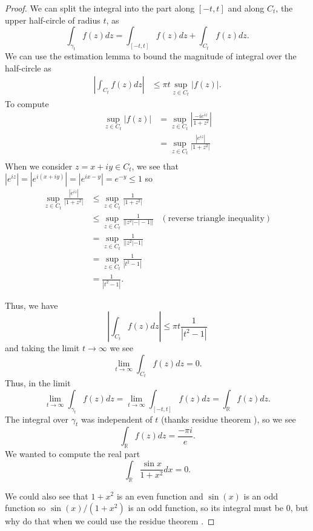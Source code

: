 \documentclass{article}
\begin{document}
\begin{enumerate}
\begin{proof}
		We can split the integral into the part along $[-t,t]$ and along $C_t$, the upper half-circle of radius $t$, as
		\[ \int_{\gamma_t} f(z) dz = \int_{[-t,t]} f(z) dz + \int_{C_t} f(z) dz.\]
		We can use the estimation lemma to bound the magnitude of integral over the half-circle as 
		\begin{align*}
			|\int_{C_t} f(z) dz |&\leq \pi t \sup_{z \in C_t} |f(z)|.
		\end{align*}
		To compute 
		\begin{align*}
			\sup_{z \in C_t} |f(z)| &= \sup_{z \in C_t} \left | \frac{-ie^{iz} }{1+z^2} \right |\\
			&= \sup_{z \in C_t} \frac{|e^{iz} |}{|1+z^2|} \\
		\end{align*}
		When we consider $z = x+iy \in C_t$, we see that $|e^{iz}| = |e^{i(x+iy)}| = | e^{ix-y} | = e^{-y} \leq 1$
		so 
		\begin{align*}
			\sup_{z \in C_t} \frac{|e^{iz} |}{|1+z^2|} & \leq \sup_{z \in C_t} \frac{1}{|1+z^2|} \\
			&\leq \sup_{z \in C_t} \frac{1}{||z^2|- |-1||} & (\text{reverse triangle inequality})\\
			&= \sup_{z \in C_t} \frac{1}{| |z^2| - 1|}\\
			&= \sup_{z \in C_t} \frac{1}{| t^2 -1 |}\\
			&= \frac{1}{|t^2-1|}.
		\end{align*}
		
		Thus, we have
		\[ \left |\int_{C_t} f(z) dz \right |\leq \pi t \frac{1}{|t^2-1|}  \]
		and taking the limit $t \rightarrow \infty$ we see
		\[ \lim_{t \rightarrow \infty} \int_{C_t} f(z) dz = 0.\]
		Thus, in the limit
		\[ \lim_{t \rightarrow \infty} \int_{\gamma_t} f(z) dz = \lim_{t \rightarrow \infty} \int_{[-t,t]} f(z) dz = \int_\mathbb{R} f(z) dz.\]
		The integral over $\gamma_t$ was independent of $t$ (thanks residue theorem \smiley{}), so we see
		\[ \int_\mathbb{R} f(z) dz = \frac{-\pi i}{e}.\]
		We wanted to compute the real part
		\[ \int_\mathbb{R} \frac{\sin x}{1+x^2} dx = 0.\]
		
		We could also see that $1+x^2$ is an even function and $\sin(x)$ is an odd function so $\sin(x)/(1+x^2)$ is an odd function, 
		so its integral must be 0, but why do that when we could use the residue theorem \smiley{}.
	\end{proof}	
	
	\setcounter{enumi}{4}
	
	\newpage
	

\end{enumerate}
\end{document}
